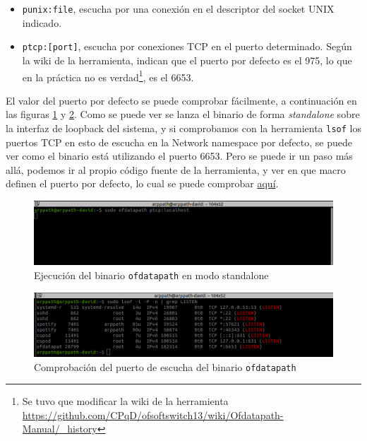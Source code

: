 \begin{itemize}
    \item \texttt{punix:file}, escucha por una conexión en el descriptor del socket UNIX indicado.

    \item \texttt{ptcp:[port]}, escucha por conexiones TCP en el puerto determinado. Según la wiki de la herramienta, indican que el puerto por defecto es el 975, lo que en la práctica no es verdad\footnote{Se tuvo que modificar la wiki de la herramienta \url{https://github.com/CPqD/ofsoftswitch13/wiki/Ofdatapath-Manual/_history}}, es el 6653.
\end{itemize}

El valor del puerto por defecto se puede comprobar fácilmente, a continuación en las figuras \ref{fig:ofdata_1} y \ref{fig:ofdata_2}. Como se puede ver se lanza el binario de forma \textit{standalone} sobre la interfaz de loopback del sistema, y si comprobamos con la herramienta \texttt{lsof} los puertos TCP en esto de escucha en la Network namespace por defecto, se puede ver como el binario está utilizando el puerto 6653. Pero se puede ir un paso más allá, podemos ir al propio código fuente de la herramienta, y ver en que macro definen el puerto por defecto, lo cual se puede comprobar \href{https://github.com/CPqD/ofsoftswitch13/blob/master/include/openflow/openflow.h#LL75C1-L75C27}{aquí}.

\begin{figure}[ht!]
    \centering
    \includegraphics[width=\textwidth]{archivos/img/analisis/ofdata_1.png}
    \caption{Ejecución del binario \texttt{ofdatapath} en modo standalone}
    \label{fig:ofdata_1}
\end{figure}

\begin{figure}[ht!]
    \centering
    \includegraphics[width=\textwidth]{archivos/img/analisis/ofdata_2.png}
    \caption{Comprobación del puerto de  escucha del binario \texttt{ofdatapath}}
    \label{fig:ofdata_2}
\end{figure}


